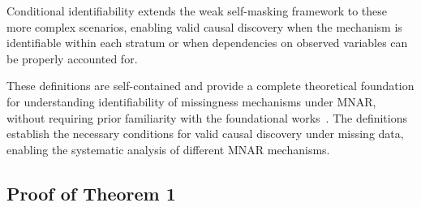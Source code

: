 \documentclass[runningheads]{llncs}
\begin{document}
Conditional identifiability extends the weak self-masking framework to these more complex scenarios, enabling valid causal discovery when the mechanism is identifiable within each stratum or when dependencies on observed variables can be properly accounted for.

These definitions are self-contained and provide a complete theoretical foundation for understanding identifiability of missingness mechanisms under MNAR, without requiring prior familiarity with the foundational works~\cite{qiao2024identification}. The definitions establish the necessary conditions for valid causal discovery under missing data, enabling the systematic analysis of different MNAR mechanisms.

\subsection{Proof of Theorem 1}
\end{document}
